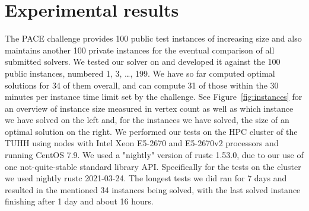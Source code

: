 \documentclass[12pt,oneside,english,parskip=full,headings=small]{scrbook}
\newcommand{\todo}[1]{\paragraph{TODO} #1}
\theoremstyle{definition}
\begin{document}

\chapter{Experimental results}
\label{sec:experimental results}

The PACE challenge provides 100 public test instances of increasing size and also maintains another
100 private instances for the eventual comparison of all submitted solvers. We tested our solver on
and developed it against the 100 public instances, numbered 1, 3, \dots, 199. We have so far
computed optimal solutions for 34 of them overall, and can compute 31 of those within the 30 minutes
per instance time limit set by the challenge. See Figure~\ref{fig:instances} for an overview of
instance size measured in vertex count as well as which instance we have solved on the left and, for
the instances we have solved, the size of an optimal solution on the right. We performed our tests
on the HPC cluster of the TUHH using nodes with Intel Xeon E5-2670 and E5-2670v2 processors and
running CentOS 7.9. We used a "nightly" version of rustc 1.53.0, due to our use of one
not-quite-stable standard library API. Specifically for the tests on the cluster we used nightly
rustc 2021-03-24. The longest tests we did ran for 7 days and resulted in the mentioned 34 instances
being solved, with the last solved instance finishing after 1 day and about 16 hours.
\end{document}
